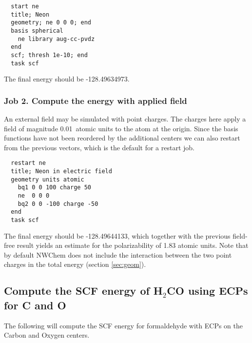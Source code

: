 \begin{verbatim}
  start ne
  title; Neon
  geometry; ne 0 0 0; end
  basis spherical 
    ne library aug-cc-pvdz
  end
  scf; thresh 1e-10; end
  task scf
\end{verbatim}

The final energy should be -128.49634973.

\subsubsection{Job 2. Compute the energy with applied field}

An external field may be simulated with point charges.  The charges
here apply a field of magnitude 0.01\ atomic units to the atom at the
origin.  Since the basis functions have not been reordered by the
additional centers we can also restart from the previous vectors,
which is the default for a restart job.

\begin{verbatim}
  restart ne
  title; Neon in electric field
  geometry units atomic
    bq1 0 0 100 charge 50
    ne  0 0 0
    bq2 0 0 -100 charge -50
  end
  task scf
\end{verbatim}

The final energy should be -128.49644133, which together with the
previous field-free result yields an estimate for the polarizability
of 1.83 atomic units.  Note that by default NWChem does not include
the interaction between the two point charges in the total energy
(section \ref{sec:geom}).

\subsection{Compute the SCF energy of H$_2$CO using ECPs for C and O}
\label{sec:sample3}

The following will compute the SCF energy for formaldehyde with ECPs
on the Carbon and Oxygen centers.

